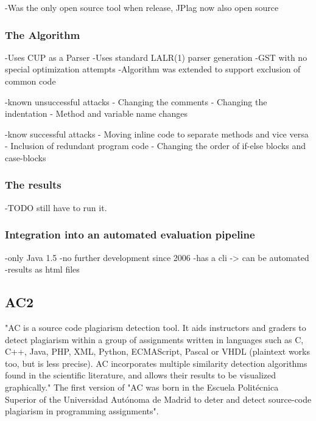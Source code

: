 \documentclass[a4paper, 11pt]{article}
\renewcommand{\\}{\vspace*{0.5\baselineskip} \newline}
\begin{document}
-Was the only open source tool when release\autocite{PLAGGIE}, JPlag now also open source

\subsubsection{The Algorithm}

-Uses CUP as a Parser
-Uses standard LALR(1) parser generation\autocite{CUP}
-GST with no special optimization attempts
-Algorithm was extended to support exclusion of common code\autocite[4. Algorithm used]{RMP}

-known unsuccessful attacks
- Changing the comments
- Changing the indentation
- Method and variable name changes\autocite[Known successful attacks]{RMP}

-know successful attacks
- Moving inline code to separate methods and vice versa
- Inclusion of redundant program code
- Changing the order of if-else blocks and case-blocks\autocite[Known unsuccessful attacks]{RMP}

\subsubsection{The results}

-TODO still have to run it.

\subsubsection{Integration into an automated evaluation pipeline}

-only Java 1.5\autocite{PLAGGIE,RMP}
-no further development since 2006
-has a cli -> can be automated
-results as html files

\newpage

\subsection{AC2}

"AC is a source code plagiarism detection tool. It aids instructors and graders to detect plagiarism within a group of assignments written in languages such as C, C++, Java, PHP, XML, Python, ECMAScript, Pascal or VHDL (plaintext works too, but is less precise). AC incorporates multiple similarity detection algorithms found in the scientific literature, and allows their results to be visualized graphically." \autocite{AC2} The first version of "AC was born in the Escuela Politécnica Superior of the Universidad Autónoma de Madrid to deter and detect source-code plagiarism in programming assignments". \autocite{AC2}
\end{document}
